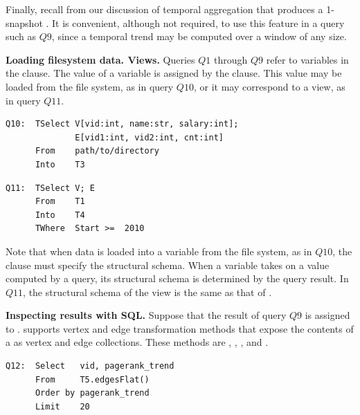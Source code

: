 Finally, recall from our discussion of temporal aggregation that
 produces a 1-snapshot \tg.  It is convenient,
although not required, to use this feature in a query such as $Q9$,
since a temporal trend may be computed over a window of any size.

{\bf Loading filesystem data.  Views.}  Queries $Q1$ through $Q9$
refer to \tg variables in the  clause.  The value of a \tg
variable is assigned by the  clause.  This value may be
loaded from the file system, as in query $Q10$, or it may correspond to
a view, as in query $Q11$.

\begin{small}
\begin{verbatim}
Q10:  TSelect V[vid:int, name:str, salary:int]; 
              E[vid1:int, vid2:int, cnt:int]
      From    path/to/directory
      Into    T3
\end{verbatim}
\end{small}

\begin{small}
\begin{verbatim}
Q11:  TSelect V; E
      From    T1
      Into    T4
      TWhere  Start >=  2010 
\end{verbatim}
\end{small}

Note that when data is loaded into a \tg variable from the file
system, as in $Q10$, the  clause must specify the
structural schema.  When a \tg variable takes on a value computed by a
query, its structural schema is determined by the query result.  In
$Q11$, the structural schema of the view  is the same as
that of .

{\bf Inspecting results with SQL.}  Suppose that the result of query
$Q9$ is assigned to .  \ql supports vertex and edge
transformation methods that expose the contents of a \tg as vertex and
edge collections.  These methods are ,
, , and .

\begin{small}
\begin{verbatim}
Q12:  Select   vid, pagerank_trend
      From     T5.edgesFlat()
      Order by pagerank_trend
      Limit    20
\end{verbatim}
\end{small}

